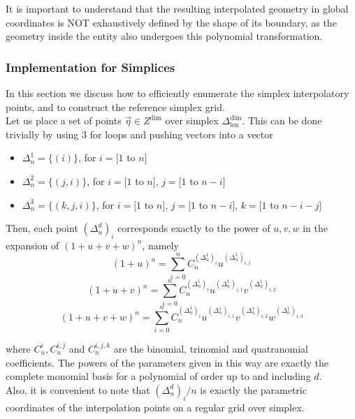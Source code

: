 \noindent
It is important to understand that the resulting interpolated geometry in global coordinates is NOT exhaustively defined by the shape of its boundary, as the geometry inside the entity also undergoes this polynomial transformation.


\subsubsection{Implementation for Simplices}
\label{subsection-simplexgrid}

\noindent
In this section we discuss how to efficiently enumerate the simplex interpolatory points, and to construct the reference simplex grid. \\

\noindent
Let us place a set of points $\vec{\eta} \in Z^{\dim}$ over simplex $\Delta^{\dim}_{\mathrm{len}}$. This can be done trivially
by using 3 for loops and pushing vectors into a vector
\begin{itemize}
	\item $\Delta^{1}_n = \{(i)\}$, for $i = [1$ to $n]$
	\item $\Delta^{2}_n = \{(j,i)\}$, for $i = [1$ to $n]$, $j = [1$ to $n - i]$
	\item $\Delta^{3}_n = \{(k,j,i)\}$, for $i = [1$ to $n]$, $j = [1$ to $n - i]$, $k = [1$ to $n - i - j]$
\end{itemize}

\noindent
Then, each point $(\Delta^{d}_n)_i$ corresponds exactly to the power of $u,v,w$ in the expansion of $(1 + u + v + w)^n$, namely
\[ (1 + u)^n = \sum_{i=0}^n C^{(\Delta^{1}_n)_i}_n u^{(\Delta^{1}_n)_{i,1}} \]
\[ (1 + u + v)^n = \sum_{i=0}^n C^{(\Delta^{1}_n)_i}_n u^{(\Delta^{1}_n)_{i,1}} v^{(\Delta^{1}_n)_{i,2}} \]
\[ (1 + u + v + w)^n = \sum_{i=0}^n C^{(\Delta^{1}_n)_i}_n u^{(\Delta^{1}_n)_{i,1}} v^{(\Delta^{1}_n)_{i,2}} w^{(\Delta^{1}_n)_{i,3}} \]

\noindent
where $C^{i}_n, C^{i,j}_n$ and $C^{i,j,k}_n$ are the binomial, trinomial and quatranomial coefficients. The powers of the parameters given in this way are exactly the complete monomial basis for a polynomial of order up to and including $d$. \\

\noindent
Also, it is convenient to note that $(\Delta^{d}_n)_i / n$ is exactly the parametric coordinates of the interpolation points on a regular grid over simplex. 

